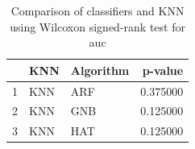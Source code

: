 \begin{table}
\footnotesize
\caption{Comparison of classifiers and KNN using Wilcoxon signed-rank test for auc}
\label{tab:KNN wilcoxon AUC comparison}
\begin{tabular}{lllr}
\hline
 & KNN & Algorithm & p-value \\
\hline
1 & KNN & ARF & 0.375000 \\
2 & KNN & GNB & 0.125000 \\
3 & KNN & HAT & 0.125000 \\
\hline
\end{tabular}
\end{table}
